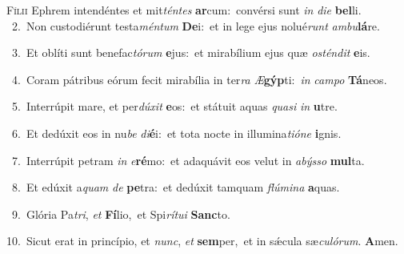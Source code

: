 \lettrine{\initial\textcolor{\initialcolor}{F}}{ílii} Ephrem intendéntes et mit\-\textit{tén}\-\textit{tes} \textbf{ar}\-cum:~\star convérsi sunt \textit{in} \textit{di}\-\textit{e} \textbf{bel}\-li.\\
{\numbfont\textcolor{\numbcolor}{~2.}}~Non custodiérunt testa\-\textit{mén}\-\textit{tum} \textbf{De}\-i:~\star et in lege ejus nolué\textit{runt} \textit{am}\-\textit{bu}\textbf{lá}re.\par
{\numbfont\textcolor{\numbcolor}{~3.}}~Et oblíti sunt benefac\-\textit{tó}\-\textit{rum} \textbf{e}\-jus:~\star et mirabílium ejus quæ \textit{os}\-\textit{tén}\textit{dit} \textbf{e}\-is.\par
{\numbfont\textcolor{\numbcolor}{~4.}}~Coram pátribus eórum fecit mirabília in ter\textit{ra} \textit{Æ}\-\textbf{gýp}ti:~\star \textit{in} \textit{cam}\-\textit{po} \textbf{Tá}\-neos.\par
{\numbfont\textcolor{\numbcolor}{~5.}}~Interrúpit mare, et per\-\textit{dú}\-\textit{xit} \textbf{e}\-os:~\star et státuit aquas \textit{qua}\-\textit{si} \textit{in} \textbf{u}\-tre.\par
{\numbfont\textcolor{\numbcolor}{~6.}}~Et dedúxit eos in nu\textit{be} \textit{di}\-\textbf{é}i:~\star et tota nocte in illumina\-\textit{ti}\-\textit{ó}\textit{ne} \textbf{i}\-gnis.\par
{\numbfont\textcolor{\numbcolor}{~7.}}~Interrúpit petram \textit{in} \textit{e}\-\textbf{ré}mo:~\star et adaquávit eos velut in \textit{a}\-\textit{býs}\textit{so} \textbf{mul}\-ta.\par
{\numbfont\textcolor{\numbcolor}{~8.}}~Et edúxit a\textit{quam} \textit{de} \textbf{pe}\-tra:~\star et dedúxit tamquam \textit{flú}\-\textit{mi}\textit{na} \textbf{a}\-quas.\par
{\numbfont\textcolor{\numbcolor}{~9.}}~Glória Pa\-\textit{tri}\-, \textit{et} \textbf{Fí}\-lio,~\star et Spi\-\textit{rí}\-\textit{tu}\textit{i} \textbf{Sanc}\-to.\par
{\numbfont\textcolor{\numbcolor}{10.}}~Sicut erat in princípio, et \textit{nunc}\-, \textit{et} \textbf{sem}\-per,~\star et in sǽcula sæ\-\textit{cu}\-\textit{ló}\textit{rum}. \textbf{A}\-men.\par
